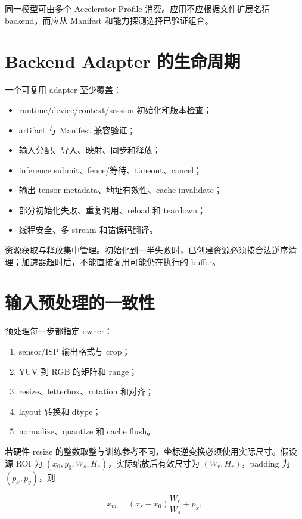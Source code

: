 同一模型可由多个 Accelerator Profile 消费。应用不应根据文件扩展名猜 backend，而应从 Manifest 和能力探测选择已验证组合。

\section{Backend Adapter 的生命周期}

一个可复用 adapter 至少覆盖：

\begin{itemize}
  \item runtime/device/context/session 初始化和版本检查；
  \item artifact 与 Manifest 兼容验证；
  \item 输入分配、导入、映射、同步和释放；
  \item inference submit、fence/等待、timeout、cancel；
  \item 输出 tensor metadata、地址有效性、cache invalidate；
  \item 部分初始化失败、重复调用、reload 和 teardown；
  \item 线程安全、多 stream 和错误码翻译。
\end{itemize}

资源获取与释放集中管理。初始化到一半失败时，已创建资源必须按合法逆序清理；加速器超时后，不能直接复用可能仍在执行的 buffer。

\section{输入预处理的一致性}

预处理每一步都指定 owner：

\begin{enumerate}
  \item sensor/ISP 输出格式与 crop；
  \item YUV 到 RGB 的矩阵和 range；
  \item resize、letterbox、rotation 和对齐；
  \item layout 转换和 dtype；
  \item normalize、quantize 和 cache flush。
\end{enumerate}

若硬件 resize 的整数取整与训练参考不同，坐标逆变换必须使用实际尺寸。假设源 ROI 为 $(x_0,y_0,W_s,H_s)$，实际缩放后有效尺寸为 $(W_r,H_r)$，padding 为 $(p_x,p_y)$，则

\begin{equation}
  x_m=(x_s-x_0)\frac{W_r}{W_s}+p_x,
\end{equation}

